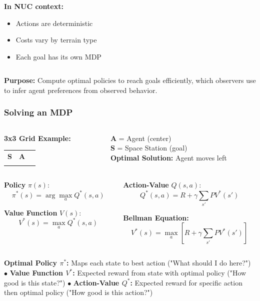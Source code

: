 \documentclass{beamer}
\begin{document}
\begin{frame}
\begin{columns}
\begin{column}{0.6\textwidth}
\vspace{0.3cm}
\textbf{In NUC context:}
\begin{itemize}
    \item<6-> Actions are deterministic
    \item<6-> Costs vary by terrain type
    \item<6-> Each goal has its own MDP
\end{itemize}
\end{column}
\end{columns}

\vspace{0.3cm}
\textbf{Purpose:} Compute optimal policies to reach goals efficiently, which observers use to infer agent preferences from observed behavior.
\end{frame}

\begin{frame}
\frametitle{Solving an MDP}
\begin{columns}
\begin{column}{0.3\textwidth}
\textbf{3x3 Grid Example:}
\begin{center}
\begin{tabular}{|c|c|c|}
\hline
 & & \\
\hline
\textbf{S} & \textbf{A} & \\
\hline
 & & \\
\hline
\end{tabular}
\end{center}
\end{column}
\begin{column}{0.65\textwidth}
\textbf{A} = Agent (center)\\
\textbf{S} = Space Station (goal)\\
\textbf{Optimal Solution:} Agent moves left
\end{column}
\end{columns}

\vspace{0.2cm}
\begin{columns}
\begin{column}{0.48\textwidth}
\textbf{Policy} $\pi(s)$:
$$\pi^*(s) = \arg\max_a Q^*(s,a)$$

\textbf{Value Function} $V(s)$:
$$V^*(s) = \max_a Q^*(s,a)$$
\end{column}
\begin{column}{0.48\textwidth}
\textbf{Action-Value} $Q(s,a)$:
$$Q^*(s,a) = R + \gamma \sum_{s'} P V^*(s')$$

\textbf{Bellman Equation:}
$$V^*(s) = \max_a [R + \gamma \sum_{s'} P V^*(s')]$$
\end{column}
\end{columns}

\vspace{0.1cm}
{\tiny
\textbf{Optimal Policy $\pi^*$:} Maps each state to best action ("What should I do here?") $\bullet$ 
\textbf{Value Function $V^*$:} Expected reward from state with optimal policy ("How good is this state?") $\bullet$ 
\textbf{Action-Value $Q^*$:} Expected reward for specific action then optimal policy ("How good is this action?")
}
\end{frame}
\end{document}
